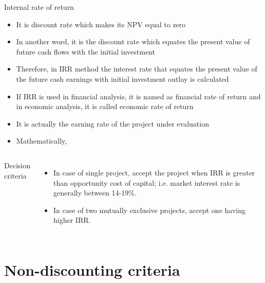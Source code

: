 \documentclass[12pt,ignorenonframetext,aspectratio=169]{beamer}
\providecommand{\tightlist}{%
  \setlength{\itemsep}{0pt}\setlength{\parskip}{0pt}}
\begin{document}
\begin{frame}{Internal rate of return}
\protect\hypertarget{internal-rate-of-return}{}
\footnotesize

\begin{itemize}
\tightlist
\item
  It is discount rate which makes its NPV equal to zero
\item
  In another word, it is the discount rate which equates the present
  value of future cash flows with the initial investment
\item
  Therefore, in IRR method the interest rate that equates the present
  value of the future cash earnings with initial investment outlay is
  calculated
\item
  If IRR is used in financial analysis, it is named as financial rate of
  return and in economic analysis, it is called economic rate of return
\item
  It is actually the earning rate of the project under evaluation
\item
  Mathematically,
\end{itemize}

\begin{columns}



Decision criteria

\begin{itemize}
\item In case of single project, accept the project when IRR is greater than opportunity cost of capital; i.e. market interest rate is generally between 14-19\%.
\item In case of two mutually exclusive projects, accept one having higher IRR.
\end{itemize}

\end{columns}
\end{frame}

\hypertarget{non-discounting-criteria}{%
\section{Non-discounting criteria}\label{non-discounting-criteria}}
\end{document}
